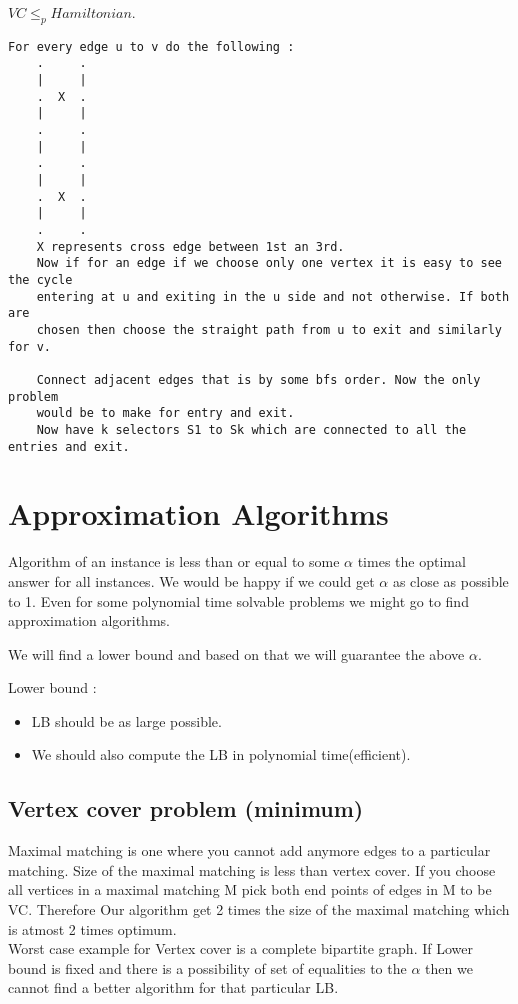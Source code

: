 \documentclass[solution,addpoints,12pt]{exam}
\begin{document}
$VC \le_p Hamiltonian$.\\
\begin{verbatim}
For every edge u to v do the following :
    .     .
    |     |
    .  X  .
    |     |
    .     .
    |     |
    .     .
    |     |
    .  X  .
    |     |
    .     .
    X represents cross edge between 1st an 3rd.
    Now if for an edge if we choose only one vertex it is easy to see the cycle
    entering at u and exiting in the u side and not otherwise. If both are
    chosen then choose the straight path from u to exit and similarly for v.

    Connect adjacent edges that is by some bfs order. Now the only problem
    would be to make for entry and exit.
    Now have k selectors S1 to Sk which are connected to all the entries and exit.
\end{verbatim}
\section{Approximation Algorithms}
Algorithm of an instance is less than or equal to some $\alpha$
times the optimal answer for all instances. We would be happy if
we could get $\alpha$ as close as possible to 1. Even for some polynomial
time solvable problems we might go to find approximation algorithms.

We will find a lower bound and based on that we will guarantee
the above $\alpha$.

Lower bound :\\
\begin{itemize}
\item LB should be as large possible.
\item We should also compute the LB in polynomial time(efficient).
\end{itemize}

\subsection{Vertex cover problem (minimum)}
Maximal matching is one where you cannot add anymore edges to a
particular matching. Size of the maximal matching is less than
vertex cover. If you choose all vertices in a maximal matching
M pick both end points of edges in M to be VC. Therefore
Our algorithm get 2 times the size of the maximal matching
which is atmost 2 times optimum.\\

Worst case example for Vertex cover is a complete
bipartite graph. If Lower bound is fixed and there is a
possibility of set of equalities to the $\alpha$ then we
cannot find a better algorithm for that particular LB.
\end{document}
